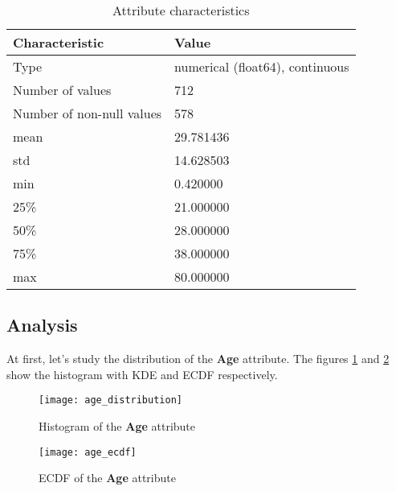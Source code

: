 \begin{table}[!ht]
    \centering
    \caption{Attribute characteristics}
    \begin{tabular}{|l|l|}
        \hline
        \textbf{Characteristic}   & \textbf{Value}                  \\ \hline
        Type                      & numerical (float64), continuous \\ \hline
        Number of values          & 712                             \\ \hline
        Number of non-null values & 578                             \\ \hline
        mean                      & 29.781436                       \\ \hline
        std                       & 14.628503                       \\ \hline
        min                       & 0.420000                        \\ \hline
        25\%                      & 21.000000                       \\ \hline
        50\%                      & 28.000000                       \\ \hline
        75\%                      & 38.000000                       \\ \hline
        max                       & 80.000000                       \\ \hline
    \end{tabular}
    \label{table:age_characteristics}
\end{table}

\subsection{Analysis}
At first, let's study the distribution of the \textbf{Age} attribute.
The figures \ref{pic:age_distribution} and \ref{pic:age_ecdf} show the 
histogram with KDE and ECDF respectively.

\begin{figure}[!ht]
    \centering
    \texttt{[image: age\_distribution]}
    \caption{Histogram of the \textbf{Age} attribute}
    \label{pic:age_distribution}
\end{figure}

\begin{figure}[!ht]
    \centering
    \texttt{[image: age\_ecdf]}
    \caption{ECDF of the \textbf{Age} attribute}
    \label{pic:age_ecdf}
\end{figure}

